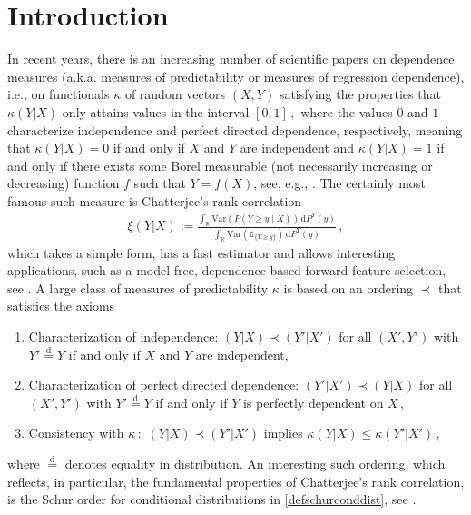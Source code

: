 \documentclass{article}
\def\1{\mathds{1}} %
\newcommand{\de}{\mathrm{\,d}}
\newcommand{\eqd}{\stackrel{\mathrm{d}}=}
\newcommand{\R}{\mathbb{R}}
\newcommand{\Var}{\mathrm{Var}}
\begin{document}
\section{Introduction}
In recent years, there is an increasing number of scientific papers on dependence measures (a.k.a. measures of predictability or measures of regression dependence), i.e., on functionals \(\kappa\) of random vectors \((X,Y)\) satisfying the properties that \(\kappa(Y|X)\) only attains values in the interval \([0,1]\,,\) where the values \(0\) and \(1\) characterize independence and perfect directed dependence, respectively, meaning that \(\kappa(Y|X)=0\) if and only if \(X\) and \(Y\) are independent and \(\kappa(Y|X)=1\) if and only if there exists some Borel measurable (not necessarily increasing or decreasing) function \(f\) such that \(Y=f(X)\), see, e.g., \cite{dette2013copula,fuchs2021quantifying,Gamboa-2022,fgwt2021,Junker-2021,Nies-2021,Shih-2021,Sungur-2005,Trutschnig-2011,Wiesel-2022}.
The certainly most famous such measure is Chatterjee's rank correlation
\begin{align}\label{eqchatt}
    \xi(Y|X) := \frac{\int_\R \Var(P(Y\geq y\mid X)) \de P^Y(y) }{\int_\R \Var(\1_{\{Y\geq y\}}) \de P^Y(y)}\,,
\end{align}
which takes a simple form, has a fast estimator and allows interesting applications, such as a model-free, dependence based forward feature selection, see \cite{Ansari-Fuchs-2022,deb2020b,chatterjee2020,chatterjee2021}.
A large class of measures of predictability \(\kappa\) is based on an ordering \(\prec\) that satisfies the axioms
\begin{enumerate}[({A}1)]
    \item \label{ax1} Characterization of independence: \((Y|X)\prec (Y'|X')\) for all \((X',Y')\) with \(Y'\stackrel{\mathrm{d}}= Y\) if and only if \(X\) and \(Y\) are independent,
    \item \label{ax2} Characterization of perfect directed dependence: \((Y'|X')\prec (Y|X)\) for all \((X',Y')\) with \(Y'\stackrel{\mathrm{d}}= Y\) if and only if \(Y\) is perfectly dependent on \(X\,,\)
    \item \label{ax3} Consistency with \(\kappa\,:\) \((Y|X)\prec (Y'|X')\) implies \(\kappa(Y|X)\leq \kappa(Y'|X')\,,\)
\end{enumerate}
where \(\eqd\) denotes equality in distribution.
An interesting such ordering, which reflects, in particular, the fundamental properties of Chatterjee's rank correlation, is the Schur order for conditional distributions in \eqref{defschurconddist}, see \cite{Ansari-Fuchs-2022,Ansari-Fuchs-2023}.
\end{document}

